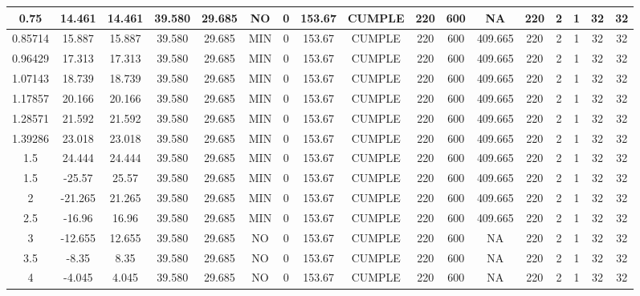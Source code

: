 \begin{table}[H]
{\begin{tabular}{|c|c|c|c|c|c|c|c|c|c|c|c|c|c|c|c|c|}
    \hline
    0.75 & 14.461 & 14.461 & 39.580 & 29.685 & NO  & 0   & 153.67 & CUMPLE & 220 & 600 & NA  & 220 & 2   & 1   & 32  & 32 \bigstrut\\
    \hline
    0.85714 & 15.887 & 15.887 & 39.580 & 29.685 & MIN & 0   & 153.67 & CUMPLE & 220 & 600 & 409.665 & 220 & 2   & 1   & 32  & 32 \bigstrut\\
    \hline
    0.96429 & 17.313 & 17.313 & 39.580 & 29.685 & MIN & 0   & 153.67 & CUMPLE & 220 & 600 & 409.665 & 220 & 2   & 1   & 32  & 32 \bigstrut\\
    \hline
    1.07143 & 18.739 & 18.739 & 39.580 & 29.685 & MIN & 0   & 153.67 & CUMPLE & 220 & 600 & 409.665 & 220 & 2   & 1   & 32  & 32 \bigstrut\\
    \hline
    1.17857 & 20.166 & 20.166 & 39.580 & 29.685 & MIN & 0   & 153.67 & CUMPLE & 220 & 600 & 409.665 & 220 & 2   & 1   & 32  & 32 \bigstrut\\
    \hline
    1.28571 & 21.592 & 21.592 & 39.580 & 29.685 & MIN & 0   & 153.67 & CUMPLE & 220 & 600 & 409.665 & 220 & 2   & 1   & 32  & 32 \bigstrut\\
    \hline
    1.39286 & 23.018 & 23.018 & 39.580 & 29.685 & MIN & 0   & 153.67 & CUMPLE & 220 & 600 & 409.665 & 220 & 2   & 1   & 32  & 32 \bigstrut\\
    \hline
    1.5 & 24.444 & 24.444 & 39.580 & 29.685 & MIN & 0   & 153.67 & CUMPLE & 220 & 600 & 409.665 & 220 & 2   & 1   & 32  & 32 \bigstrut\\
    \hline
    1.5 & -25.57 & 25.57 & 39.580 & 29.685 & MIN & 0   & 153.67 & CUMPLE & 220 & 600 & 409.665 & 220 & 2   & 1   & 32  & 32 \bigstrut\\
    \hline
    2   & -21.265 & 21.265 & 39.580 & 29.685 & MIN & 0   & 153.67 & CUMPLE & 220 & 600 & 409.665 & 220 & 2   & 1   & 32  & 32 \bigstrut\\
    \hline
    2.5 & -16.96 & 16.96 & 39.580 & 29.685 & MIN & 0   & 153.67 & CUMPLE & 220 & 600 & 409.665 & 220 & 2   & 1   & 32  & 32 \bigstrut\\
    \hline
    3   & -12.655 & 12.655 & 39.580 & 29.685 & NO  & 0   & 153.67 & CUMPLE & 220 & 600 & NA  & 220 & 2   & 1   & 32  & 32 \bigstrut\\
    \hline
    3.5 & -8.35 & 8.35 & 39.580 & 29.685 & NO  & 0   & 153.67 & CUMPLE & 220 & 600 & NA  & 220 & 2   & 1   & 32  & 32 \bigstrut\\
    \hline
    4   & -4.045 & 4.045 & 39.580 & 29.685 & NO  & 0   & 153.67 & CUMPLE & 220 & 600 & NA  & 220 & 2   & 1   & 32  & 32 \bigstrut\\

\end{tabular}}
\end{table}
